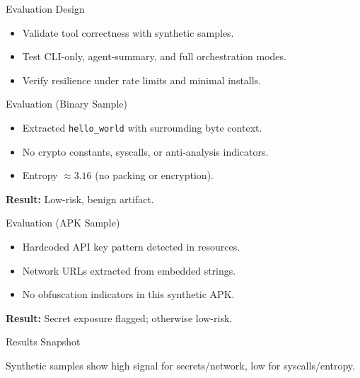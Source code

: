 \documentclass{beamer}
\begin{document}
\begin{frame}{Evaluation Design}
  \begin{itemize}
    \item Validate tool correctness with synthetic samples.
    \item Test CLI-only, agent-summary, and full orchestration modes.
    \item Verify resilience under rate limits and minimal installs.
  \end{itemize}
\end{frame}

\begin{frame}{Evaluation (Binary Sample)}
  \begin{itemize}
    \item Extracted \texttt{hello\_world} with surrounding byte context.
    \item No crypto constants, syscalls, or anti-analysis indicators.
    \item Entropy $\approx 3.16$ (no packing or encryption).
  \end{itemize}
  \vspace{4pt}
  \textbf{Result:} Low-risk, benign artifact.
\end{frame}

\begin{frame}{Evaluation (APK Sample)}
  \begin{itemize}
    \item Hardcoded API key pattern detected in resources.
    \item Network URLs extracted from embedded strings.
    \item No obfuscation indicators in this synthetic APK.
  \end{itemize}
  \vspace{4pt}
  \textbf{Result:} Secret exposure flagged; otherwise low-risk.
\end{frame}

\begin{frame}{Results Snapshot}
  \centering
  \vspace{4pt}
  \small Synthetic samples show high signal for secrets/network, low for syscalls/entropy.
\end{frame}
\end{document}
